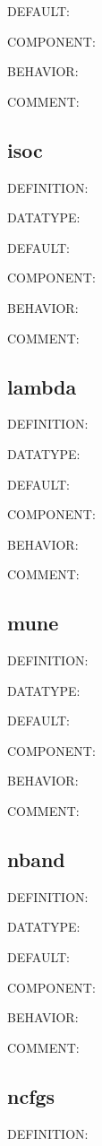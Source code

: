{\color{blue}DEFAULT:}

{\color{brown}COMPONENT:}

{\color{purple}BEHAVIOR:}

{\color{olive}COMMENT:}

\subsection{isoc}
{\color{red}DEFINITION:}

{\color{green}DATATYPE:}

{\color{blue}DEFAULT:}

{\color{brown}COMPONENT:}

{\color{purple}BEHAVIOR:}

{\color{olive}COMMENT:}

\subsection{lambda}
{\color{red}DEFINITION:}

{\color{green}DATATYPE:}

{\color{blue}DEFAULT:}

{\color{brown}COMPONENT:}

{\color{purple}BEHAVIOR:}

{\color{olive}COMMENT:}

\subsection{mune}
{\color{red}DEFINITION:}

{\color{green}DATATYPE:}

{\color{blue}DEFAULT:}

{\color{brown}COMPONENT:}

{\color{purple}BEHAVIOR:}

{\color{olive}COMMENT:}

\subsection{nband}
{\color{red}DEFINITION:}

{\color{green}DATATYPE:}

{\color{blue}DEFAULT:}

{\color{brown}COMPONENT:}

{\color{purple}BEHAVIOR:}

{\color{olive}COMMENT:}

\subsection{ncfgs}
{\color{red}DEFINITION:}

